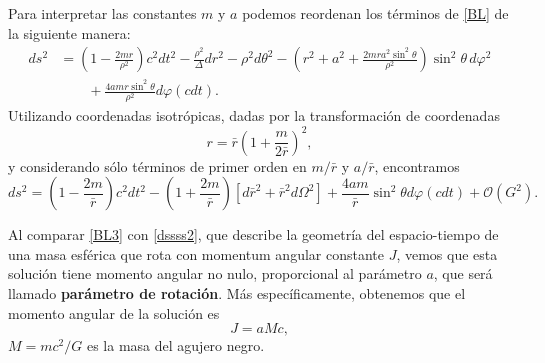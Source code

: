Para interpretar las constantes $m$ y $a$ podemos reordenan los términos de \eqref{BL} de la siguiente manera:
\begin{equation}
\begin{aligned}\label{BL2}
ds^2&=\left(1-\frac{2mr}{\rho^2}\right)c^2dt^2-\frac{\rho^2}{\Delta}dr^2-\rho^2d\theta^2-\left(r^2+a^2+\frac{2mra^2\sin^2 \theta}{\rho^2}\right)\sin^2\theta\,d\varphi^2\\
&\qquad+\frac{4amr\sin^2\theta}{\rho^2}d\varphi(cdt) .
\end{aligned}
\end{equation}
Utilizando coordenadas isotrópicas, dadas por la transformación de coordenadas
\begin{equation}
r=\bar{r}\left(1+\frac{m}{2\bar{r}}\right)^2,
\end{equation}
y considerando sólo términos de primer orden en $m/\bar{r}$ y $a/\bar{r}$, encontramos
\begin{equation}
ds^2 =\left(1-\frac{2m}{\bar{r}} \right)c^2dt^2-\left(1+\frac{2m}{\bar{r}} \right)\left[d\bar{r}^2+\bar{r}^2d\Omega^2\right]+\frac{4am}{\bar{r}}\sin^2\theta d\varphi(cdt)+\mathcal{O}(G^2) .\label{BL3}
\end{equation}

Al comparar \eqref{BL3} con \eqref{dssss2}, que describe la geometría del espacio-tiempo de una masa esférica que rota con momentum angular constante $J$, vemos que esta solución tiene momento angular no nulo, proporcional al parámetro $a$, que será llamado \textbf{parámetro de rotación}. Más específicamente, obtenemos que el momento angular de la solución es
\begin{equation}
J=aMc,
\end{equation}
$M=mc^2/G$ es la masa del agujero negro.
%

